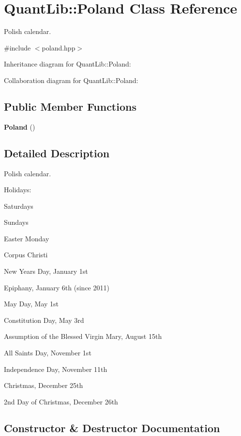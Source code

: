\section{Quant\+Lib\+:\+:Poland Class Reference}
\label{class_quant_lib_1_1_poland}


Polish calendar.  




{\ttfamily \#include $<$poland.\+hpp$>$}



Inheritance diagram for Quant\+Lib\+:\+:Poland\+:


Collaboration diagram for Quant\+Lib\+:\+:Poland\+:
\subsection*{Public Member Functions}
\begin{DoxyCompactItemize}
\item 
{\bf Poland} ()
\end{DoxyCompactItemize}


\subsection{Detailed Description}
Polish calendar. 

Holidays\+: 
\begin{DoxyItemize}
\item Saturdays 
\item Sundays 
\item Easter Monday 
\item Corpus Christi 
\item New Year\textquotesingle{}s Day, January 1st 
\item Epiphany, January 6th (since 2011) 
\item May Day, May 1st 
\item Constitution Day, May 3rd 
\item Assumption of the Blessed Virgin Mary, August 15th 
\item All Saints Day, November 1st 
\item Independence Day, November 11th 
\item Christmas, December 25th 
\item 2nd Day of Christmas, December 26th 
\end{DoxyItemize}

\subsection{Constructor \& Destructor Documentation}
